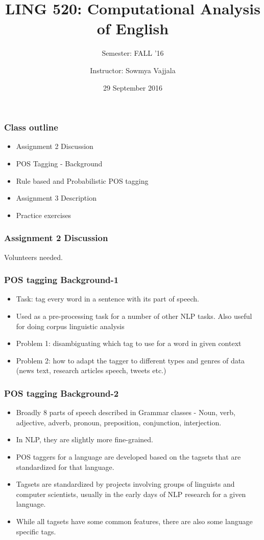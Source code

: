 \documentclass{beamer}
\author[Sowmya Vajjala]{Instructor: Sowmya Vajjala}
\title[LING 520]{LING 520: Computational Analysis of English}
\subtitle{Semester: FALL '16}
\date{29 September 2016}
\institute{Iowa State University, USA}
\begin{document}
\begin{frame}\titlepage
\end{frame}

\begin{frame}
\frametitle{Class outline}
\begin{itemize}
\item Assignment 2 Discussion
\item POS Tagging - Background
\item Rule based and Probabilistic POS tagging
\item Assignment 3 Description
\item Practice exercises
\end{itemize}
\end{frame}

\begin{frame}
\frametitle{Assignment 2 Discussion}
Volunteers needed.
\end{frame}

\begin{frame}
\frametitle{POS tagging Background-1}
\begin{itemize}
\item Task: tag every word in a sentence with its part of speech.
\item Used as a pre-processing task for a number of other NLP tasks. Also useful for doing corpus linguistic analysis
\item Problem 1: disambiguating which tag to use for a word in given context
\item Problem 2: how to adapt the tagger to different types and genres of data (news text, research articles speech, tweets etc.)
\end{itemize}
\end{frame}

\begin{frame}
\frametitle{POS tagging Background-2}
\begin{itemize}
\item Broadly 8 parts of speech described in Grammar classes - Noun, verb, adjective, adverb, pronoun, preposition, conjunction, interjection.
\item In NLP, they are slightly more fine-grained.
\item POS taggers for a language are developed based on the tagsets that are standardized for that language.
\item Tagsets are standardized by projects involving groups of linguists and computer scientists, usually in the early days of NLP research for a given language.
\item While all tagsets have some common features, there are also some language specific tags.
\end{itemize}
\end{frame}
\end{document}

